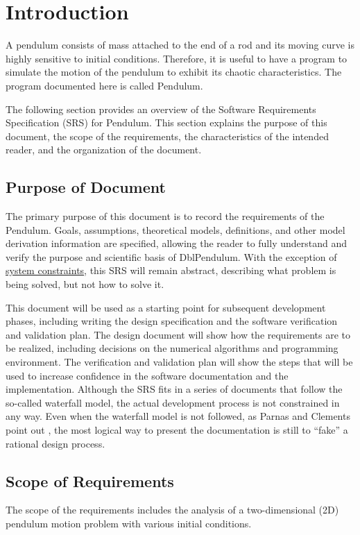 \documentclass[12pt]{article}
\begin{document}
\section{Introduction}
\label{Sec:Intro}
A pendulum consists of mass attached to the end of a rod and its moving curve is highly sensitive to initial conditions. Therefore, it is useful to have a program to simulate the motion of the pendulum to exhibit its chaotic characteristics. The program documented here is called Pendulum.

The following section provides an overview of the Software Requirements Specification (SRS) for Pendulum. This section explains the purpose of this document, the scope of the requirements, the characteristics of the intended reader, and the organization of the document.

\subsection{Purpose of Document}
\label{Sec:DocPurpose}
The primary purpose of this document is to record the requirements of the Pendulum. Goals, assumptions, theoretical models, definitions, and other model derivation information are specified, allowing the reader to fully understand and verify the purpose and scientific basis of DblPendulum. With the exception of \hyperref[Sec:SysConstraints]{system constraints}, this SRS will remain abstract, describing what problem is being solved, but not how to solve it.

This document will be used as a starting point for subsequent development phases, including writing the design specification and the software verification and validation plan. The design document will show how the requirements are to be realized, including decisions on the numerical algorithms and programming environment. The verification and validation plan will show the steps that will be used to increase confidence in the software documentation and the implementation. Although the SRS fits in a series of documents that follow the so-called waterfall model, the actual development process is not constrained in any way. Even when the waterfall model is not followed, as Parnas and Clements point out \cite{parnasClements1986}, the most logical way to present the documentation is still to ``fake'' a rational design process.

\subsection{Scope of Requirements}
\label{Sec:ReqsScope}
The scope of the requirements includes the analysis of a two-dimensional (2D) pendulum motion problem with various initial conditions.
\end{document}

